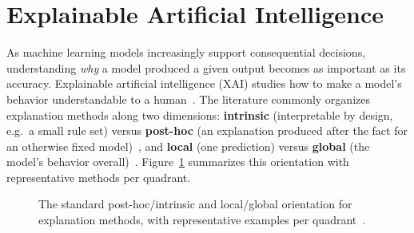 \section{Explainable Artificial Intelligence}\label{sec:fund_xai}

As machine learning models increasingly support consequential decisions,
understanding \emph{why} a model produced a given output becomes as
important as its accuracy. Explainable artificial intelligence (XAI)
studies how to make a model's behavior understandable to a
human~\cite{guidotti2018survey, arrieta2020xai}. The literature commonly
organizes explanation methods along two dimensions: \textbf{intrinsic}
(interpretable by design, e.g.\ a small rule set) versus \textbf{post-hoc}
(an explanation produced after the fact for an otherwise fixed
model)~\cite{guidotti2018survey}, and \textbf{local} (one prediction)
versus \textbf{global} (the model's behavior overall)~\cite{arrieta2020xai}.
Figure~\ref{fig:xai_taxonomy} summarizes this orientation with
representative methods per quadrant.

\begin{figure}[tbp]
\centering
{}
\caption{The standard post-hoc/intrinsic and local/global
  orientation for explanation methods, with representative examples per
  quadrant~\cite{guidotti2018survey, arrieta2020xai, ying2019gnnexplainer}.}
\label{fig:xai_taxonomy}
\end{figure}

